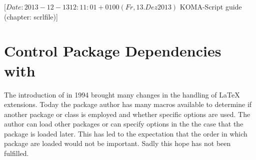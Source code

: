 %
%
%
%
%
%
%
%
% 
%
%
%
%

                 [$Date: 2013-12-13 12:11:01 +0100 (Fr, 13. Dez 2013) $
                  KOMA-Script guide (chapter: scrlfile)]


\chapter{Control Package Dependencies with }


The introduction of {\LaTeXe} in 1994 brought many changes in the
handling of {\LaTeX} extensions.  Today the package author has many
macros available to determine if another package or class is
employed and whether specific options are used.  The author can load
other packages or can specify options in the the case that the
package is loaded later.  This has led to the expectation that the
order in which package are loaded would not be important.  Sadly
this hope has not been fulfilled.

